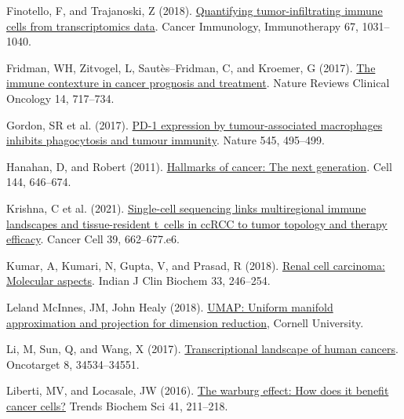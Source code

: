 \documentclass[
  parskip,
  oneside]{scrreprt}
\newlength{\cslhangindent}
\newlength{\cslentryspacingunit} %
\newenvironment{CSLReferences}[2] %
 {%
  \setlength{\parindent}{0pt}
  \ifodd #1
  \let\oldpar\par
  \def\par{\hangindent=\cslhangindent\oldpar}
  \fi
  \setlength{\parskip}{#2\cslentryspacingunit}
 }%
 {}
\begin{document}
\begin{CSLReferences}{0}{0}
\leavevmode{}%
Finotello, F, and Trajanoski, Z (2018).
\href{https://doi.org/10.1007/s00262-018-2150-z}{Quantifying
tumor-infiltrating immune cells from transcriptomics data}. Cancer
Immunology, Immunotherapy 67, 1031--1040.

\leavevmode{}%
Fridman, WH, Zitvogel, L, Sautès--Fridman, C, and Kroemer, G (2017).
\href{https://doi.org/10.1038/nrclinonc.2017.101}{The immune contexture
in cancer prognosis and treatment}. Nature Reviews Clinical Oncology 14,
717--734.

\leavevmode{}%
Gordon, SR et al. (2017).
\href{https://doi.org/10.1038/nature22396}{PD-1 expression by
tumour-associated macrophages inhibits phagocytosis and tumour
immunity}. Nature 545, 495--499.

\leavevmode{}%
Hanahan, D, and Robert (2011).
\href{https://doi.org/10.1016/j.cell.2011.02.013}{Hallmarks of cancer:
The next generation}. Cell 144, 646--674.

\leavevmode{}%
Krishna, C et al. (2021).
\href{https://doi.org/10.1016/j.ccell.2021.03.007}{Single-cell
sequencing links multiregional immune landscapes and tissue-resident
t~cells in ccRCC to tumor topology and therapy efficacy}. Cancer Cell
39, 662--677.e6.

\leavevmode{}%
Kumar, A, Kumari, N, Gupta, V, and Prasad, R (2018).
\href{https://doi.org/10.1007/s12291-017-0713-y}{Renal cell carcinoma:
Molecular aspects}. Indian J Clin Biochem 33, 246--254.

\leavevmode{}%
Leland McInnes, JM, John Healy (2018).
\href{\%0Ahttps://doi.org/10.48550/arXiv.1802.03426}{UMAP: Uniform
manifold approximation and projection for dimension reduction}, Cornell
University.

\leavevmode{}%
Li, M, Sun, Q, and Wang, X (2017).
\href{https://doi.org/10.18632/oncotarget.15837}{Transcriptional
landscape of human cancers}. Oncotarget 8, 34534--34551.

\leavevmode{}%
Liberti, MV, and Locasale, JW (2016).
\href{https://doi.org/10.1016/j.tibs.2015.12.001}{The warburg effect:
How does it benefit cancer cells?} Trends Biochem Sci 41, 211--218.


\end{CSLReferences}
\end{document}
